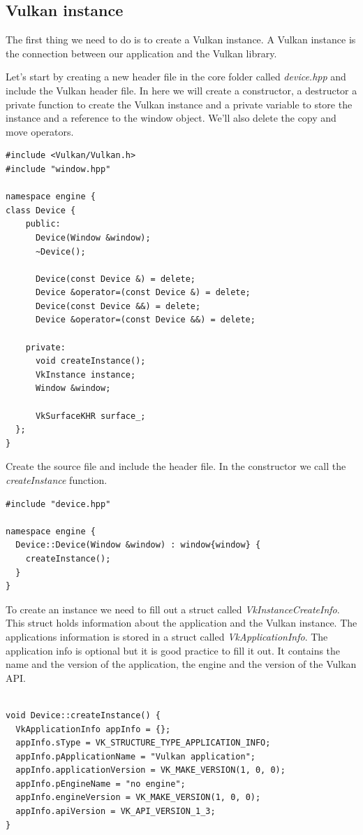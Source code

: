 \documentclass[12pt]{report} \usepackage{preamble}
\begin{document}
\subsection{Vulkan instance}

The first thing we need to do is to create a Vulkan instance.
A Vulkan instance is the connection between our application and the Vulkan library.

Let's start by creating a new header file in the core folder called \textit{device.hpp}
and include the Vulkan header file. In here we will create a constructor, a destructor
a private function to create the Vulkan instance and a private variable to store the instance
and a reference to the window object. We'll also delete the copy and move operators.

\begin{lstlisting}[Language=C++]
#include <Vulkan/Vulkan.h>
#include "window.hpp"

namespace engine {
class Device {
    public:
      Device(Window &window);
      ~Device();
      
      Device(const Device &) = delete;
      Device &operator=(const Device &) = delete;
      Device(const Device &&) = delete;
      Device &operator=(const Device &&) = delete;

    private:
      void createInstance();
      VkInstance instance;
      Window &window;

      VkSurfaceKHR surface_;
  };
}
\end{lstlisting}

Create the source file and include the header file. In the constructor we call the
\textit{createInstance} function.

\begin{lstlisting}[Language=C++]
#include "device.hpp"

namespace engine {
  Device::Device(Window &window) : window{window} {
    createInstance();
  }
}
\end{lstlisting}

To create an instance we need to fill out a struct called \textit{VkInstanceCreateInfo}.
This struct holds information about the application and the Vulkan instance.
The applications information is stored in a struct called \textit{VkApplicationInfo}.
The application info is optional but it is good practice to fill it out. It contains
the name and the version of the application, the engine and the version of the Vulkan \ac{API}.

\begin{lstlisting}[Language=C++]

void Device::createInstance() {
  VkApplicationInfo appInfo = {};
  appInfo.sType = VK_STRUCTURE_TYPE_APPLICATION_INFO;
  appInfo.pApplicationName = "Vulkan application";
  appInfo.applicationVersion = VK_MAKE_VERSION(1, 0, 0);
  appInfo.pEngineName = "no engine";
  appInfo.engineVersion = VK_MAKE_VERSION(1, 0, 0);
  appInfo.apiVersion = VK_API_VERSION_1_3;
}
\end{lstlisting}
\end{document}
